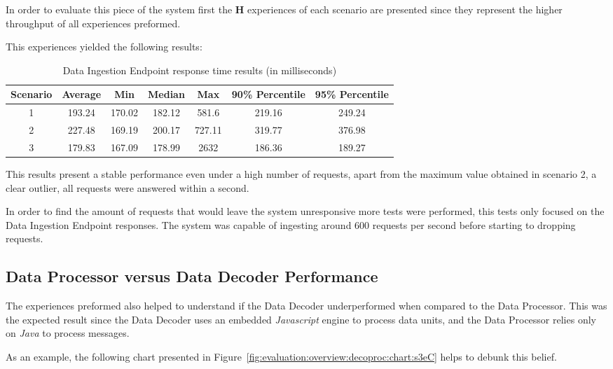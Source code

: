 In order to evaluate this piece of the system first the \textbf{H} experiences of each scenario are presented since they represent the higher throughput of all experiences preformed.

This experiences yielded the following results:

\begin{table}[H]
    \caption{Data Ingestion Endpoint response time results (in milliseconds)}
    \label{tab:evaluation:overview:endpoint:results}
    \centering
    \begin{tabular}{@{}ccccccc@{}}
    \toprule
    \textbf{Scenario} & \textbf{Average} & \textbf{Min} & \textbf{Median} & \textbf{Max} & \textbf{90\% Percentile} & \textbf{95\% Percentile} \\ \midrule
    1 & 193.24 & 170.02 & 182.12 & 581.6 & 219.16 & 249.24 \\ \midrule
    2 & 227.48 & 169.19 & 200.17 & 727.11 & 319.77 & 376.98 \\ \midrule
    3 & 179.83 & 167.09 & 178.99 & 2632 & 186.36 & 189.27 \\ \bottomrule
    \end{tabular}
\end{table}

This results present a stable performance even under a high number of requests, apart from the maximum value obtained in scenario 2, a clear outlier, all requests were answered within a second.

In order to find the amount of requests that would leave the system unresponsive more tests were performed, this tests only focused on the Data Ingestion Endpoint responses. The system was capable of ingesting around 600 requests per second before starting to dropping requests.

\subsection{Data Processor versus Data Decoder Performance}
\label{subsec:evaluation:overview:decoproc}

The experiences preformed also helped to understand if the Data Decoder  underperformed when compared to the Data Processor. This was the expected result since the Data Decoder uses an embedded \textit{Javascript} engine to process data units, and the Data Processor relies only on \textit{Java} to process messages.

As an example, the following chart presented in Figure~\ref{fig:evaluation:overview:decoproc:chart:s3eC} helps to debunk this belief.

